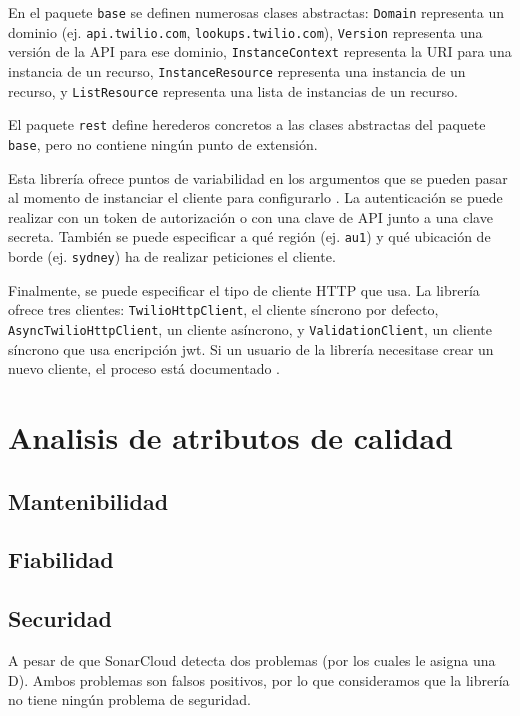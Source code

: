 \documentclass{article}
\begin{document}
En el paquete \verb|base| se definen numerosas clases abstractas:
\verb|Domain| representa un dominio
(ej. \verb|api.twilio.com|, \verb|lookups.twilio.com|),
\verb|Version| representa una versión de la API para ese dominio,
\verb|InstanceContext| representa la URI para una instancia de un recurso,
\verb|InstanceResource| representa una instancia de un recurso,
y \verb|ListResource| representa una lista de instancias de un recurso.

El paquete \verb|rest| define herederos concretos a las clases abstractas
del paquete \verb|base|, pero no contiene ningún punto de extensión.

\hfill

Esta librería ofrece puntos de variabilidad
en los argumentos que se pueden pasar
al momento de instanciar el cliente para configurarlo
\cite{readme}.
La autenticación se puede realizar con un token de autorización o
con una clave de API junto a una clave secreta.
También se puede especificar a qué región (ej. \verb|au1|)
y qué ubicación de borde (ej. \verb|sydney|)
ha de realizar peticiones el cliente.

Finalmente, se puede especificar el tipo de cliente HTTP que usa.
La librería ofrece tres clientes:
\verb|TwilioHttpClient|, el cliente síncrono por defecto,
\verb|AsyncTwilioHttpClient|, un cliente asíncrono, y
\verb|ValidationClient|, un cliente síncrono que usa encripción jwt.
Si un usuario de la librería necesitase crear un nuevo cliente,
el proceso está documentado
\cite{crear-cliente-http}.

\section{Analisis de atributos de calidad}

\subsection{Mantenibilidad}

\subsection{Fiabilidad}

\subsection{Securidad}

A pesar de que SonarCloud detecta dos problemas
(por los cuales le asigna una D).
Ambos problemas son falsos positivos, 
por lo que consideramos que la librería no tiene ningún problema de seguridad.
\end{document}
